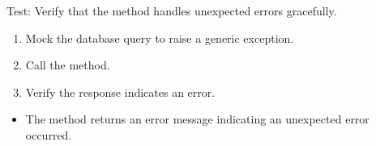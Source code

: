 \documentclass[letterpaper,10pt,english]{sphinxmanual}
\begin{document}
\begin{fulllineitems}
\label{\detokenize{test:test.test_residetnt.test_get_resident_by_id_unexpected_error}}
\pysigstartsignatures
\pysiglinewithargsret
{}
{\sphinxparamcomma {}}
{}
\pysigstopsignatures
\sphinxAtStartPar
Test: Verify that the method handles unexpected errors gracefully.
\begin{description}
\begin{enumerate}
%
\item {} 
\sphinxAtStartPar
Mock the database query to raise a generic exception.

\item {} 
\sphinxAtStartPar
Call the  method.

\item {} 
\sphinxAtStartPar
Verify the response indicates an error.

\end{enumerate}

\begin{itemize}
\item {} 
\sphinxAtStartPar
The method returns an error message indicating an unexpected error occurred.

\end{itemize}

\end{description}

\end{fulllineitems}

\end{document}
